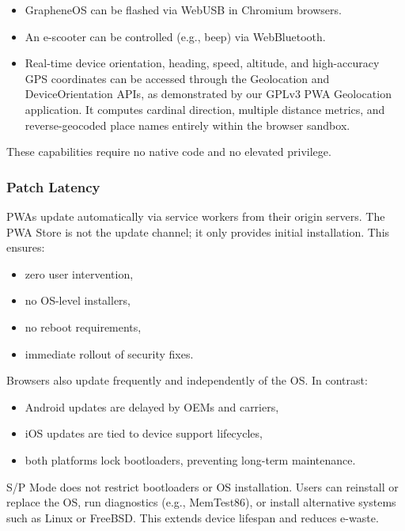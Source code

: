 \begin{itemize}
    \item GrapheneOS can be flashed via WebUSB in Chromium browsers.
    \item An e-scooter can be controlled (e.g., beep) via WebBluetooth.
    \item Real-time device orientation, heading, speed, altitude, and high-accuracy GPS coordinates can be accessed through the Geolocation and DeviceOrientation APIs, as demonstrated by our GPLv3 PWA Geolocation application. It computes cardinal direction, multiple distance metrics, and reverse-geocoded place names entirely within the browser sandbox.
\end{itemize}

These capabilities require no native code and no elevated privilege.

\subsubsection{Patch Latency}

PWAs update automatically via service workers from their origin servers. The PWA Store is not the update channel; it only provides initial installation. This ensures:

\begin{itemize}
    \item zero user intervention,
    \item no OS-level installers,
    \item no reboot requirements,
    \item immediate rollout of security fixes.
\end{itemize}

Browsers also update frequently and independently of the OS. In contrast:

\begin{itemize}
    \item Android updates are delayed by OEMs and carriers,
    \item iOS updates are tied to device support lifecycles,
    \item both platforms lock bootloaders, preventing long-term maintenance.
\end{itemize}

S/P Mode does not restrict bootloaders or OS installation. Users can reinstall or replace the OS, run diagnostics (e.g., MemTest86), or install alternative systems such as Linux or FreeBSD. This extends device lifespan and reduces e-waste.

